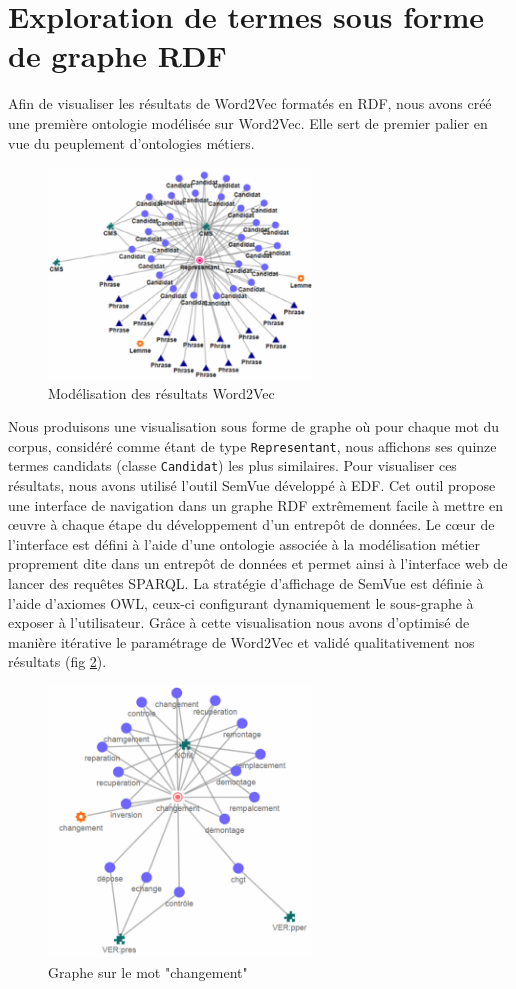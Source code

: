 \section{Exploration de termes sous forme de graphe RDF}

Afin de visualiser les résultats de Word2Vec formatés en RDF, nous avons créé une première ontologie modélisée sur Word2Vec. Elle sert de premier palier en vue du peuplement d'ontologies métiers.
%
\begin{figure}[tb]
    \begin{center}
        \includegraphics[width=7cm]{figures/gtype}
    \end{center}
    \caption{Modélisation des résultats Word2Vec}\label{fig:gtype}
\end{figure}
%
Nous produisons une visualisation sous forme de graphe où pour chaque mot du corpus, considéré comme étant de type \texttt{Representant}, nous affichons ses quinze termes candidats (classe \texttt{Candidat}) les plus similaires.
Pour visualiser ces résultats, nous avons utilisé l'outil SemVue développé à EDF. Cet outil propose une interface de navigation dans un graphe RDF extrêmement facile à mettre en œuvre à chaque étape du développement d’un entrepôt de données. Le cœur de l’interface est défini à l’aide d’une ontologie associée à la modélisation métier proprement dite dans un entrepôt de données \cite{mnpho14parallel-materialisation-RDFox} et permet ainsi à l’interface web de lancer des requêtes SPARQL. La stratégie d’affichage de SemVue est définie à l’aide d’axiomes OWL, ceux-ci configurant dynamiquement le sous-graphe à exposer à l’utilisateur.
Grâce à cette visualisation nous avons d'optimisé de manière itérative le paramétrage de Word2Vec et validé qualitativement nos résultats (fig \ref{fig:w2v}).
%
\begin{figure}[tb]
    \begin{center}
        \includegraphics[width=7cm]{figures/w2v}
    \end{center}
    \caption{Graphe sur le mot "changement"}\label{fig:w2v}
\end{figure}
%
